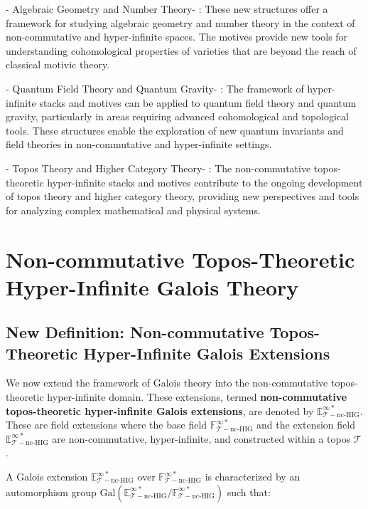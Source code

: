 \documentclass{article}
\begin{document}
-  Algebraic Geometry and Number Theory- : These new structures offer a framework for studying algebraic geometry and number theory in the context of non-commutative and hyper-infinite spaces. The motives provide new tools for understanding cohomological properties of varieties that are beyond the reach of classical motivic theory.

-  Quantum Field Theory and Quantum Gravity- : The framework of hyper-infinite stacks and motives can be applied to quantum field theory and quantum gravity, particularly in areas requiring advanced cohomological and topological tools. These structures enable the exploration of new quantum invariants and field theories in non-commutative and hyper-infinite settings.

-  Topos Theory and Higher Category Theory- : The non-commutative topos-theoretic hyper-infinite stacks and motives contribute to the ongoing development of topos theory and higher category theory, providing new perspectives and tools for analyzing complex mathematical and physical systems.



\section{Non-commutative Topos-Theoretic Hyper-Infinite Galois Theory}
\subsection{New Definition: Non-commutative Topos-Theoretic Hyper-Infinite Galois Extensions}
We now extend the framework of Galois theory into the non-commutative topos-theoretic hyper-infinite domain. These extensions, termed \textbf{non-commutative topos-theoretic hyper-infinite Galois extensions}, are denoted by \(\mathbb{E}_{\mathcal{T}-\text{nc-HIG}}^{\infty *}\). These are field extensions where the base field \(\mathbb{F}_{\mathcal{T}-\text{nc-HIG}}^{\infty *}\) and the extension field \(\mathbb{E}_{\mathcal{T}-\text{nc-HIG}}^{\infty *}\) are non-commutative, hyper-infinite, and constructed within a topos \(\mathcal{T}\).

A Galois extension \(\mathbb{E}_{\mathcal{T}-\text{nc-HIG}}^{\infty *}\) over \(\mathbb{F}_{\mathcal{T}-\text{nc-HIG}}^{\infty *}\) is characterized by an automorphism group \(\text{Gal}(\mathbb{E}_{\mathcal{T}-\text{nc-HIG}}^{\infty *}/\mathbb{F}_{\mathcal{T}-\text{nc-HIG}}^{\infty *})\) such that:
\end{document}
